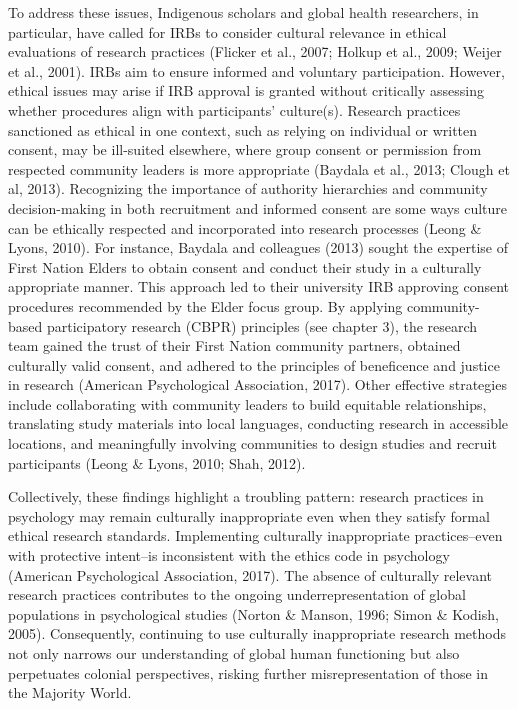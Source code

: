\documentclass[
  11pt,
]{book}
\begin{document}
To address these issues, Indigenous scholars and global health researchers, in particular, have called for IRBs to consider cultural relevance in ethical evaluations of research practices (Flicker et al., 2007; Holkup et al., 2009; Weijer et al., 2001). IRBs aim to ensure informed and voluntary participation. However, ethical issues may arise if IRB approval is granted without critically assessing whether procedures align with participants' culture(s). Research practices sanctioned as ethical in one context, such as relying on individual or written consent, may be ill-suited elsewhere, where group consent or permission from respected community leaders is more appropriate (Baydala et al., 2013; Clough et al, 2013). Recognizing the importance of authority hierarchies and community decision-making in both recruitment and informed consent are some ways culture can be ethically respected and incorporated into research processes (Leong \& Lyons, 2010). For instance, Baydala and colleagues (2013) sought the expertise of First Nation Elders to obtain consent and conduct their study in a culturally appropriate manner. This approach led to their university IRB approving consent procedures recommended by the Elder focus group. By applying community-based participatory research (CBPR) principles (see chapter 3), the research team gained the trust of their First Nation community partners, obtained culturally valid consent, and adhered to the principles of beneficence and justice in research (American Psychological Association, 2017). Other effective strategies include collaborating with community leaders to build equitable relationships, translating study materials into local languages, conducting research in accessible locations, and meaningfully involving communities to design studies and recruit participants (Leong \& Lyons, 2010; Shah, 2012).

Collectively, these findings highlight a troubling pattern: research practices in psychology may remain culturally inappropriate even when they satisfy formal ethical research standards. Implementing culturally inappropriate practices--even with protective intent--is inconsistent with the ethics code in psychology (American Psychological Association, 2017). The absence of culturally relevant research practices contributes to the ongoing underrepresentation of global populations in psychological studies (Norton \& Manson, 1996; Simon \& Kodish, 2005). Consequently, continuing to use culturally inappropriate research methods not only narrows our understanding of global human functioning but also perpetuates colonial perspectives, risking further misrepresentation of those in the Majority World.
\end{document}
